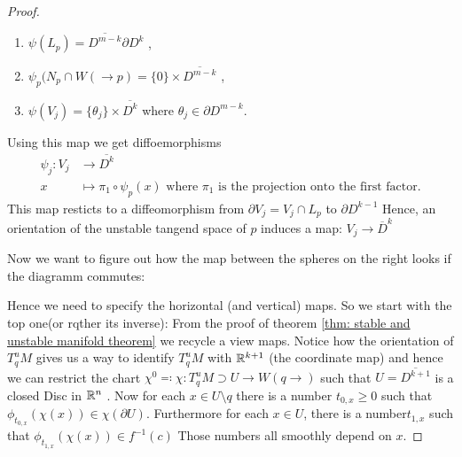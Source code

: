 \begin{proof}
\begin{enumerate}
	\item $\psi(L_p)=\overline{D^{m-k}}\partial D^{k}$ ,
	\item $\psi_p(N_p\cap W(\to p)=\{0\}\times \overline{D^{m-k}}$ ,
	\item $\psi(V_j)=\{\theta_j\} \times \overline{D^{k}} $ where $\theta_j\in \partial D^{m-k}$.
\end{enumerate}
Using this map we get diffoemorphisms 
\begin{align*}
	\psi_j:   V_j &\to \overline{D^{k}}\\
	x             &\mapsto \pi_1\circ \psi_p(x) \text{ where $\pi_1$ is the projection onto the first factor.}
\end{align*} This map resticts to a diffeomorphism from $\partial V_j=V_j\cap L_p$ to $\partial D^{k-1}$ Hence, an orientation of the unstable tangend space of $p$ induces a map:
$V_j\to \overline D^k$

Now we want to figure out how the map between the spheres on the right looks if the diagramm commutes:
\begin{center}
\end{center}
Hence we need to specify the horizontal (and vertical) maps. 
So we start with the top one(or rqther its inverse):
From the proof of theorem \ref{thm: stable and unstable manifold theorem} we recycle a view maps. 
Notice how the orientation of $T^u_qM$ gives us a way to identify $T^u_qM$ with $\mathbb{R}^{k+1}$ (the coordinate map) and hence we can restrict the chart $\chi^0 \eqcolon \chi:T^u_q M\supset U\to W(q\to)$ such that $U=\overline{D^{k+1}}$ is a closed Disc in $\mathbb{R}^n$ . Now for each 
$x\in  U\setminus q$ there is a number $t_{0,x}\geq 0$ such that $\phi_{t_{0,x}}(\chi(x))\in \chi(\partial U)$. Furthermore for each $x\in  U$, there is a number$t_{1,x}$ such that $\phi_{t_{1,x}}(\chi(x))\in f^{-1}(c)$ Those numbers all smoothly depend on $x$.


\end{proof}
